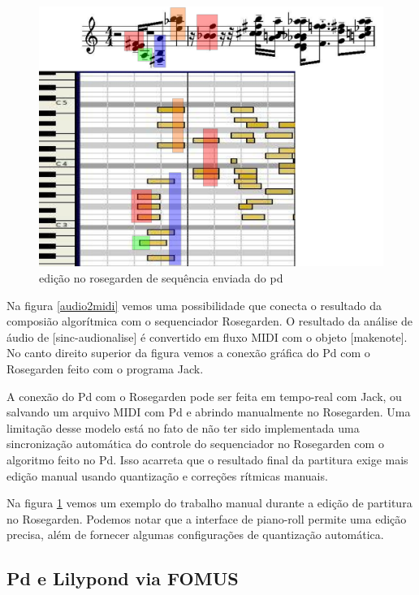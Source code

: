 \documentclass{ppgmus}
\begin{document}
\begin{figure}
\includegraphics[scale=.6]{teste-noquantize}
\caption{edição no rosegarden de sequência enviada do pd}
\label{noquantize}
\end{figure} 

Na figura \ref{audio2midi} vemos uma possibilidade que conecta
o resultado da composião algorítmica com o sequenciador Rosegarden.
O resultado da análise de áudio de [sinc-audionalise] é convertido
em fluxo MIDI com o objeto [makenote]. No canto direito superior da figura
vemos a conexão gráfica do Pd com o Rosegarden feito com o programa Jack.

A conexão do Pd com o Rosegarden pode ser feita em tempo-real com Jack, ou
salvando um arquivo MIDI com Pd e abrindo manualmente no Rosegarden.
Uma limitação desse modelo está no fato de não ter sido implementada uma sincronização
automática do controle do sequenciador no Rosegarden com o algoritmo
feito no Pd. Isso acarreta que o resultado final da partitura exige
mais edição manual usando quantização e correções rítmicas manuais.

Na figura \ref{noquantize} vemos um exemplo do trabalho manual durante a 
edição de partitura no Rosegarden. Podemos notar que a interface de piano-roll
permite uma edição precisa, além de fornecer algumas configurações de 
quantização automática.


\subsection{Pd e Lilypond via FOMUS}
\end{document}
